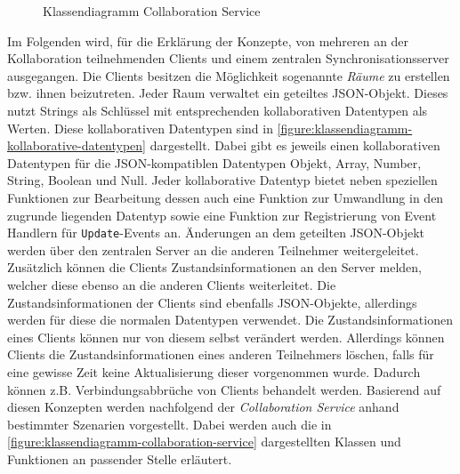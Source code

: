 \begin{figure}[tbp]
    \caption{Klassendiagramm Collaboration Service}
    \label{figure:klassendiagramm-collaboration-service}
\end{figure}

Im Folgenden wird, für die Erklärung der Konzepte, von mehreren an der Kollaboration teilnehmenden Clients und einem zentralen Synchronisationsserver ausgegangen. Die Clients besitzen die Möglichkeit sogenannte \textit{Räume} zu erstellen bzw. ihnen beizutreten. Jeder Raum verwaltet ein geteiltes JSON-Objekt. Dieses nutzt Strings als Schlüssel mit entsprechenden kollaborativen Datentypen als Werten. Diese kollaborativen Datentypen sind in \autoref{figure:klassendiagramm-kollaborative-datentypen} dargestellt. Dabei gibt es jeweils einen kollaborativen Datentypen für die JSON-kompatiblen Datentypen Objekt, Array, Number, String, Boolean und Null. Jeder kollaborative Datentyp bietet neben speziellen Funktionen zur Bearbeitung dessen auch eine Funktion zur Umwandlung in den zugrunde liegenden Datentyp sowie eine Funktion zur Registrierung von Event Handlern für \texttt{Update}-Events an. Änderungen an dem geteilten JSON-Objekt werden über den zentralen Server an die anderen Teilnehmer weitergeleitet. Zusätzlich können die Clients Zustandsinformationen an den Server melden, welcher diese ebenso an die anderen Clients weiterleitet. Die Zustandsinformationen der Clients sind ebenfalls JSON-Objekte, allerdings werden für diese die normalen Datentypen verwendet. Die Zustandsinformationen eines Clients können nur von diesem selbst verändert werden. Allerdings können Clients die Zustandsinformationen eines anderen Teilnehmers löschen, falls für eine gewisse Zeit keine Aktualisierung dieser vorgenommen wurde. Dadurch können z.B. Verbindungsabbrüche von Clients behandelt werden. Basierend auf diesen Konzepten werden nachfolgend der \textit{Collaboration Service} anhand bestimmter Szenarien vorgestellt. Dabei werden auch die in \autoref{figure:klassendiagramm-collaboration-service} dargestellten Klassen und Funktionen an passender Stelle erläutert.

